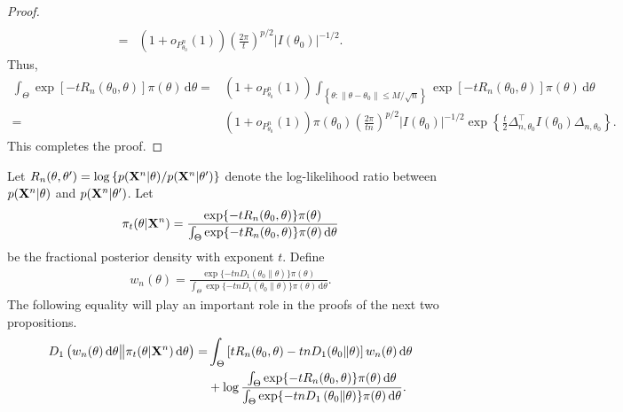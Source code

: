 \documentclass[11pt]{article}
\theoremstyle{plain}
\theoremstyle{definition}
\theoremstyle{remark}
\begin{document}
\begin{appendices}
\begin{proof}
$$\begin{aligned}
                \\
                =&
                (1+o_{P^n_{\theta_0}}(1))
                \left(\frac{2\pi}{t}\right)^{{p}/{2}} |I({\theta_0})|^{-{1}/{2}}
.
            \end{aligned}
        $$
        Thus,
$$
\begin{aligned}
     \int_{\Theta}
\exp[-t R_n(\theta_0, \theta)] \pi(\theta)
\, \mathrm d \theta
    =&
    (1+o_{P^n_{\theta_0}}(1))
\int_{\left\{ \theta: \|\theta - \theta_0\| \leq M/\sqrt n \right\}}
\exp[-t R_n(\theta_0, \theta)] \pi(\theta)
\, \mathrm d \theta
    \\
    =
    &
    (1+o_{P^n_{\theta_0}}(1))
    \pi(\theta_0)
    \left(\frac{2\pi}{t n}\right)^{{p}/{2}}
    |I(\theta_0)|^{-{1}/{2}} 
    \exp
    \left\{ 
        \frac{t}{2}\Delta_{n,\theta_0}^\top  I({\theta_0})\Delta_{n,\theta_0}
\right\}
    .
\end{aligned}
$$
This completes the proof.
\end{proof}

    Let $R_n (\theta, \theta' )= \log \left\{ p(\mathbf{X}^{n}|\theta)/ p(\mathbf{X}^{n}|\theta') \right\}$ denote the log-likelihood ratio between $p(\mathbf{X}^{n} | \theta )$ and $ p(\mathbf{X}^{n} | \theta' )$.
       Let
       \begin{align*}
           \pi_t( \theta | \mathbf{X}^{n})
           =
           \frac{
               \exp \{-t R_n (\theta_0, \theta)\} \pi(\theta) 
           }{
           \int_{\Theta}  \exp \{-t R_n (\theta_0, \theta)\} \pi(\theta) \, \mathrm d \theta
           }
       \end{align*}
       be the fractional posterior density with exponent $t$.
       Define
       \begin{align*}
           w_n(\theta) =
           \frac{
               \exp \{ -t n D_1\left( \theta_0 \| \theta \right) \} \pi(\theta)
           }{
               \int_{\Theta} 
               \exp \{ -t n D_1\left( \theta_0 \| \theta \right) \} \pi(\theta) \, \mathrm d \theta
           }.
       \end{align*}
       The following equality will play an important role in the proofs of the next two propositions.
\begin{equation}\label{eq:leiApp}
    \begin{aligned}
     D_1\left( 
        w_n (\theta) \, \mathrm d \theta
        \big\|
        \pi_t (\theta | \mathbf{X}^{n}) \, \mathrm d \theta
    \right)
    = &
    \int_{\Theta}
    \left[   t R_n(\theta_0, \theta) - tn D_1 (\theta_0 \| \theta )  \right]
    w_n (\theta) \, \mathrm d \theta
    \\
    &
    + \log \frac{
        \int_{\Theta} \exp \{-t R_n (\theta_0, \theta)\} \pi (\theta) \, \mathrm d \theta  
    }
    {
        \int_\Theta \exp \{-tn D_1 \left( \theta_0 \| \theta \right)\} \pi(\theta) \, \mathrm d \theta
    }
    .
    \end{aligned}
\end{equation}



\end{appendices}
\end{document}
